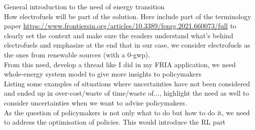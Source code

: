 
%
%

General introduction to the need of energy transition\\

How electrofuels will be part of the solution. Here include part of the terminology paper \url{https://www.frontiersin.org/articles/10.3389/fenrg.2021.660073/full} to clearly set the context and make sure the readers understand what's behind electrofuels and emphasize at the end that in our case, we consider electrofuels as the ones from renewable sources (with a 0-gwp).\\

From this need, develop a thread like I did in my FRIA application, we need whole-energy system model to give more insights to policymakers\\

Listing some examples of situations where uncertainties have not been considered and ended up in over-cost/waste of time/waste of..., highlight the need as well to consider uncertainties when we want to advise policymakers.\\

As the question of policymakers is not only what to do but how to do it, we need to address the optimisation of policies. This would introduce the RL part





